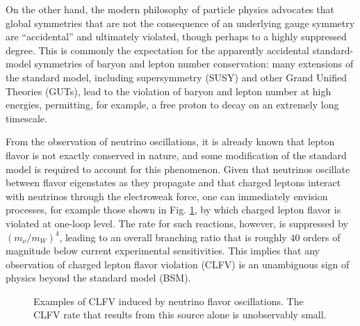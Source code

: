 \documentclass{book}[letterpaper,12pt]
\begin{document}
On the other hand, the modern philosophy of particle physics advocates that global symmetries that are not the consequence of an underlying gauge symmetry are ``accidental'' and ultimately violated, though perhaps to a highly suppressed degree. This is commonly the expectation for the apparently accidental standard-model symmetries of baryon and lepton number conservation: many extensions of the standard model, including supersymmetry (SUSY) and other Grand Unified Theories (GUTs), lead to the violation of baryon and lepton number at high energies, permitting, for example, a free proton to decay on an extremely long timescale. 

From the observation of neutrino oscillations, it is already known that lepton flavor is not exactly conserved in nature, and some modification of the standard model is required to account for this phenomenon. Given that neutrinos oscillate between flavor eigenstates as they propagate and that charged leptons interact with neutrinos through the electroweak force, one can immediately envision processes, for example those shown in Fig. \ref{fig:neutrino_clfv}, by which charged lepton flavor is violated at one-loop level. The rate for such reactions, however, is suppressed by $(m_{\nu}/m_W)^4$, leading to an overall branching ratio that is roughly $40$ orders of magnitude below current experimental sensitivities. This implies that any observation of charged lepton flavor violation (CLFV) is an unambiguous sign of physics beyond the standard model (BSM).

\begin{figure}
\centering
{}
\hspace{5cm}
\caption{Examples of CLFV induced by neutrino flavor oscillations. The CLFV rate that results from this source alone is unobservably small.}
\label{fig:neutrino_clfv}
\end{figure}
 
\end{document}
